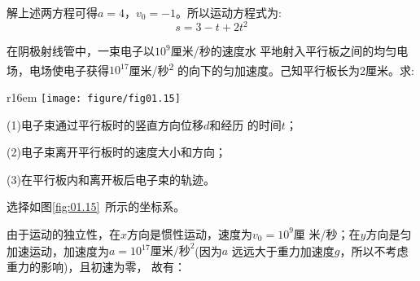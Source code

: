 \documentclass[../outline-of-mechanics.tex]{subfiles}
\begin{document}
解上述两方程可得$a=4$，$v_0=-1$。所以运动方程式为:
\begin{equation*}
  s=3-t+2t^2
\end{equation*}

\example 在阴极射线管中，一束电子以$10^9$厘米/秒的速度水
平地射入平行板之间的均匀电场，电场使电子获得$10^{17}$厘米/秒\textsuperscript{2}
的向下的匀加速度。己知平行板长为2厘米。求:

\begin{wrapfigure}[8]{r}{16em}
  \centering
  \texttt{[image: figure/fig01.15]}
  \caption{}
  \label{fig:01.15}
\end{wrapfigure}
(1)电子束通过平行板时的竖直方向位移$d$和经历
的时间$t$；

(2)电子束离开平行板时的速度大小和方向；

(3)在平行板内和离开板后电子束的轨迹。

\solution 选择如图\ref{fig:01.15}~所示的坐标系。

由于运动的独立性，在$x$方向是惯性运动，速度为$v_0=10^9$厘
米/秒；在$y$方向是匀加速运动，加速度为$a=10^{17}\text{厘米/秒}^2$(因为$a$
远远大于重力加速度$g$，所以不考虑重力的影响)，且初速为零，
故有：
\end{document}
